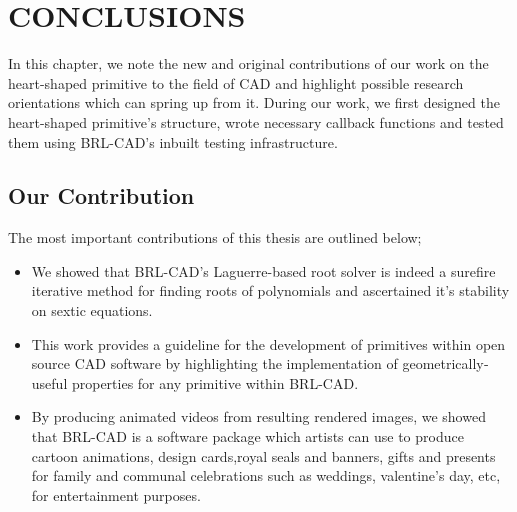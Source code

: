 \chapter{CONCLUSIONS}

\hspace{30} In   this   chapter,   we   note   the   new   and   original   contributions   of   our   work   on  
the   heart-­shaped   primitive   to   the   field   of   CAD   and   highlight  
possible   research   orientations   which   can   spring   up   from   it.   During   our   work,   we  
first   designed   the   heart­-shaped   primitive's   structure,   wrote   necessary   callback  
functions and tested them using BRL-­CAD's inbuilt testing infrastructure. 


\section{Our Contribution}

The most important contributions of this thesis are outlined below;  

\begin{itemize}
\item We   showed   that   BRL-­CAD's   Laguerre-­based   root   solver   is   indeed   a  
sure­fire   iterative   method   for   finding   roots   of   polynomials   and   ascertained  
it's stability on sextic equations.  
\item This   work   provides   a   guideline   for   the   development   of   primitives   within  
open   source   CAD   software   by   highlighting   the  implementation   of   
geometrically­ useful   properties   for   any   primitive   within BRL-­CAD.  
\item By   producing   animated   videos   from   resulting   rendered   images,   we  
showed   that   BRL­-CAD   is   a   software   package   which   artists   can   use   to  
produce   cartoon   animations,   design   cards,royal   seals   and   banners,   gifts  
and   presents   for   family   and   communal   celebrations   such   as   weddings,  
valentine's day, etc, for entertainment purposes.
\end{itemize}

